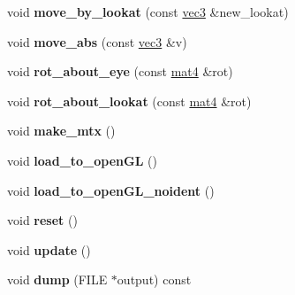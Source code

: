 \begin{DoxyCompactItemize}
\item 
\hypertarget{classViewModel_ab9b3509733f69be33a3b40d423602307}{void {\bfseries move\-\_\-by\-\_\-lookat} (const \hyperlink{classvec3}{vec3} \&new\-\_\-lookat)}\label{classViewModel_ab9b3509733f69be33a3b40d423602307}

\item 
\hypertarget{classViewModel_a49fb15f40a792a117ff716c0e6a61529}{void {\bfseries move\-\_\-abs} (const \hyperlink{classvec3}{vec3} \&v)}\label{classViewModel_a49fb15f40a792a117ff716c0e6a61529}

\item 
\hypertarget{classViewModel_af702e1a43ca18c3123463e8118989e74}{void {\bfseries rot\-\_\-about\-\_\-eye} (const \hyperlink{classmat4}{mat4} \&rot)}\label{classViewModel_af702e1a43ca18c3123463e8118989e74}

\item 
\hypertarget{classViewModel_a4a03d4b7598c5284f77f6103110eb46d}{void {\bfseries rot\-\_\-about\-\_\-lookat} (const \hyperlink{classmat4}{mat4} \&rot)}\label{classViewModel_a4a03d4b7598c5284f77f6103110eb46d}

\item 
\hypertarget{classViewModel_a2c5c0f4cdc2bb42e6f69e2054ded6995}{void {\bfseries make\-\_\-mtx} ()}\label{classViewModel_a2c5c0f4cdc2bb42e6f69e2054ded6995}

\item 
\hypertarget{classViewModel_ac05260de5c5374bc079e9612117883c6}{void {\bfseries load\-\_\-to\-\_\-open\-G\-L} ()}\label{classViewModel_ac05260de5c5374bc079e9612117883c6}

\item 
\hypertarget{classViewModel_a06a5428055544ca85ab75d04d3dca73a}{void {\bfseries load\-\_\-to\-\_\-open\-G\-L\-\_\-noident} ()}\label{classViewModel_a06a5428055544ca85ab75d04d3dca73a}

\item 
\hypertarget{classViewModel_a6a807f2e7701289a78fb5aa18c444509}{void {\bfseries reset} ()}\label{classViewModel_a6a807f2e7701289a78fb5aa18c444509}

\item 
\hypertarget{classViewModel_a9bd98726904d8a9687bce95a02f59bb1}{void {\bfseries update} ()}\label{classViewModel_a9bd98726904d8a9687bce95a02f59bb1}

\item 
\hypertarget{classViewModel_a853a1fff8e31a6c3e7dde680430cc027}{void {\bfseries dump} (F\-I\-L\-E $\ast$output) const }\label{classViewModel_a853a1fff8e31a6c3e7dde680430cc027}

\end{DoxyCompactItemize}
